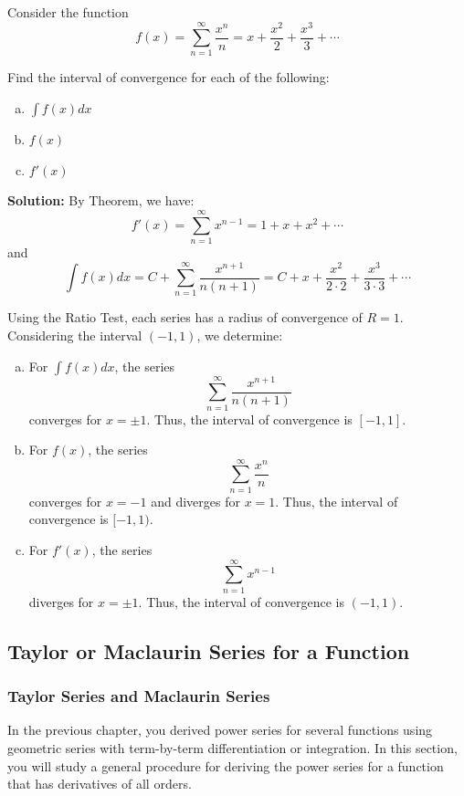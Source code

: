 \documentclass[12pt]{article}
\theoremstyle{beautifulthm}
\begin{document}
\begin{tcolorbox}[colback=examplebg, colframe=red!75!black, title=\textbf{EXAMPLE 8: Intervals of Convergence for $f(x)$, $f'(x)$, and $\int f(x) dx$}, fonttitle=\bfseries, sharp corners]

Consider the function 
\[
f(x) = \sum_{n=1}^\infty \frac{x^n}{n} = x + \frac{x^2}{2} + \frac{x^3}{3} + \cdots
\]

Find the interval of convergence for each of the following:
\begin{enumerate}[a.]
    \item $\int f(x) dx$
    \item $f(x)$
    \item $f'(x)$
\end{enumerate}

\tcblower
\textbf{Solution:} 
 By Theorem, we have:
\[
f'(x) = \sum_{n=1}^\infty x^{n-1} = 1 + x + x^2 + \cdots
\]
and
\[
\int f(x) dx = C + \sum_{n=1}^\infty \frac{x^{n+1}}{n(n+1)} = C + x + \frac{x^2}{2 \cdot 2} + \frac{x^3}{3 \cdot 3} + \cdots
\]

Using the Ratio Test, each series has a radius of convergence of $R = 1$. Considering the interval $(-1, 1)$, we determine:

\begin{enumerate}[a.]
    \item For $\int f(x) dx$, the series 
    \[
    \sum_{n=1}^\infty \frac{x^{n+1}}{n(n+1)}
    \]
    converges for $x = \pm 1$. Thus, the interval of convergence is $[-1, 1]$.

    \item For $f(x)$, the series 
    \[
    \sum_{n=1}^\infty \frac{x^n}{n}
    \]
    converges for $x = -1$ and diverges for $x = 1$. Thus, the interval of convergence is $[-1, 1)$.

    \item For $f'(x)$, the series 
    \[
    \sum_{n=1}^\infty x^{n-1}
    \]
    diverges for $x = \pm 1$. Thus, the interval of convergence is $(-1, 1)$.
\end{enumerate}
\end{tcolorbox}

\subsection{Taylor or Maclaurin Series for a Function}
\subsubsection{Taylor Series and Maclaurin Series}
In the previous chapter, you derived power series for several functions using geometric series with term-by-term differentiation or integration. In this section, you will study a general procedure for deriving the power series for a function that has derivatives of all orders.
\end{document}
